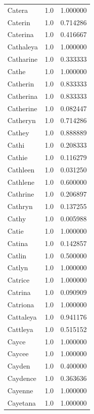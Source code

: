 \documentclass[
  letterpaper,
  DIV=11,
  numbers=noendperiod]{scrreprt}
\begin{document}
\begin{tabular}{lrr}
Catera          &   1.0 &   1.000000 \\
Caterin         &   1.0 &   0.714286 \\
Caterina        &   1.0 &   0.416667 \\
Cathaleya       &   1.0 &   1.000000 \\
Catharine       &   1.0 &   0.333333 \\
Cathe           &   1.0 &   1.000000 \\
Catherin        &   1.0 &   0.833333 \\
Catherina       &   1.0 &   0.833333 \\
Catherine       &   1.0 &   0.082447 \\
Catheryn        &   1.0 &   0.714286 \\
Cathey          &   1.0 &   0.888889 \\
Cathi           &   1.0 &   0.208333 \\
Cathie          &   1.0 &   0.116279 \\
Cathleen        &   1.0 &   0.031250 \\
Cathlene        &   1.0 &   0.600000 \\
Cathrine        &   1.0 &   0.206897 \\
Cathryn         &   1.0 &   0.137255 \\
Cathy           &   1.0 &   0.005988 \\
Catie           &   1.0 &   1.000000 \\
Catina          &   1.0 &   0.142857 \\
Catlin          &   1.0 &   0.500000 \\
Catlyn          &   1.0 &   1.000000 \\
Catrice         &   1.0 &   1.000000 \\
Catrina         &   1.0 &   0.090909 \\
Catriona        &   1.0 &   1.000000 \\
Cattaleya       &   1.0 &   0.941176 \\
Cattleya        &   1.0 &   0.515152 \\
Cayce           &   1.0 &   1.000000 \\
Caycee          &   1.0 &   1.000000 \\
Cayden          &   1.0 &   0.400000 \\
Caydence        &   1.0 &   0.363636 \\
Cayenne         &   1.0 &   1.000000 \\
Cayetana        &   1.0 &   1.000000 \\

\end{tabular}
\end{document}
